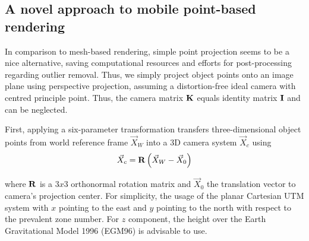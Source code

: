 \documentclass[review]{elsarticle}
\begin{document}

\subsection{A novel approach to mobile point-based rendering}
\label{sec:algorithms:pbr}
In comparison to mesh-based rendering, simple point projection seems to be a nice alternative, saving computational resources and efforts for post-processing regarding outlier removal.%
Thus, we simply project object points onto an image plane using perspective projection, assuming a distortion-free ideal camera with centred principle point. Thus, the camera matrix $\bf K$ equals identity matrix $\bf I$ and can be neglected.

First, applying a six-parameter transformation transfers three-dimensional object points from world reference frame $\vec{X}_W$ into a 3D camera system $\vec{X}_c $ using
\begin{equation}
\vec{X}_c = {\bf R} \left( \vec{X}_W - \vec{X}_0 \right) 
\label{eq:projection_simple}
\end{equation} 

where $\bf R$ is a $3x3$ orthonormal rotation matrix and $\vec{X}_0 $ the translation vector to camera's projection center. For simplicity, the usage of the planar Cartesian UTM system with $x$ pointing to the east and $y$ pointing to the north with respect to the prevalent zone number. For $z$ component, the height over the Earth Gravitational Model 1996 (EGM96) is advisable to use. 
\end{document}
